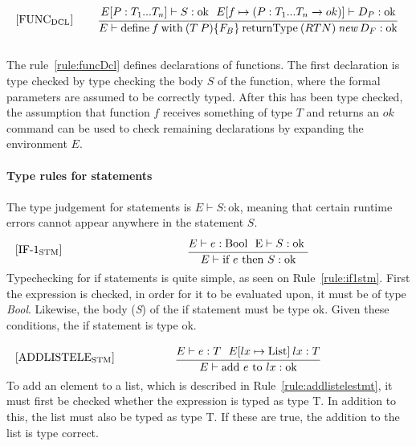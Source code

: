 \begin{equation}\label{rule:funcDcl}
\begin{minipage}{.2\linewidth}
$[\text{FUNC}_\text{DCL}]$
\end{minipage}
\begin{minipage}{.8\linewidth}
\centering
$\cfrac{E[P : T_1...T_n] \vdash S : \text{ok} \: \: \: E[f \mapsto (P: T_1...T_n \xrightarrow{} ok)] \vdash D_P : \text{ok}}{E \vdash \text{define} \: f \: \text{with} \: (T \: P) \{F_B\} \: \text{returnType} \: (RTN) \: \textit{new} \: D_F : \text{ok}}$
\end{minipage}
\end{equation}
\\
The rule~\ref{rule:funcDcl} defines declarations of functions. The first declaration is type checked by type checking the body $S$ of the function, where the formal parameters are assumed to be correctly typed. After this has been type checked, the assumption that function $f$ receives something of type $T$ and returns an $ok$ command can be used to check remaining declarations by expanding the environment $E$.
\\\\
\textbf{Type rules for statements}
\\\\
The type judgement for statements is $E \vdash S : \text{ok}$,  meaning that certain runtime errors cannot appear anywhere in the statement $S$.
\\
\begin{equation}\label{rule:if1stm}
\begin{minipage}{.2\linewidth}
$[\text{IF-1}_\text{STM}]$
\end{minipage}
\begin{minipage}{.8\linewidth}
\centering
$\cfrac{E \vdash e : \text{Bool } \text{ E} \vdash S : \text{ok }}{E \vdash \text{if } e \text{ then } S : \text{ok}}$
\end{minipage}
\end{equation}
Typechecking for if statements is quite simple, as seen on Rule~\ref{rule:if1stm}. First the expression is checked, in order for it to be evaluated upon, it must be of type \textit{Bool}. Likewise, the body (\textit{S}) of the if statement must be type ok. Given these conditions, the if statement is type ok.


\begin{equation}\label{rule:addlistelestmt}
\begin{minipage}{.2\linewidth}
$[\text{ADDLISTELE}_\text{STM}]$
\end{minipage}
\begin{minipage}{.8\linewidth}
\centering
$\cfrac{E \vdash e : T \: \: \: E[lx \mapsto \text{List}] \: lx : T} {E \vdash \text{add } e \text{ to } lx: \text{ok} }$
\end{minipage}
\end{equation}
To add an element to a list, which is described in Rule~\ref{rule:addlistelestmt}, it must first be checked whether the expression is typed as type T. In addition to this, the list must also be typed as type T. If these are true, the addition to the list is type correct.

